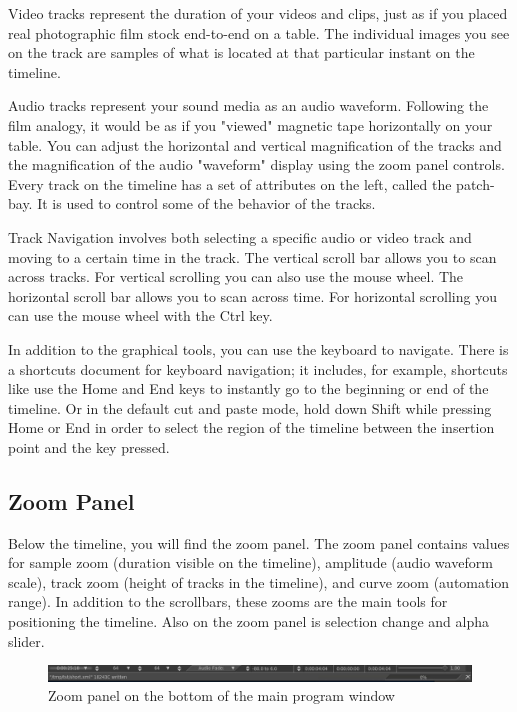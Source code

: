 Video tracks represent the duration of your videos and clips, just as if you placed real photographic film stock end-to-end on a table. 
The individual images you see on the track are samples of what is located at that particular instant on the timeline.

Audio tracks represent your sound media as an audio waveform. 
Following the film analogy, it would be as if you "viewed" magnetic tape horizontally on your table. 
You can adjust the horizontal and vertical magnification of the tracks and the magnification of the audio "waveform" display using the zoom panel controls. 
Every track on the timeline has a set of attributes on the left, called the patch-bay. 
It is used to control some of the behavior of the tracks.

Track Navigation involves both selecting a specific audio or video track and moving to a certain time in the track. 
The vertical scroll bar allows you to scan across tracks. 
For vertical scrolling you can also use the mouse wheel. 
The horizontal scroll bar allows you to scan across time. For horizontal scrolling you can use the mouse wheel with the Ctrl key.  

In addition to the graphical tools, you can use the keyboard to navigate.  
There is a shortcuts document for keyboard navigation; it includes, for example, shortcuts like use the Home and End keys to instantly go to the beginning or end of the timeline.  
Or in the default cut and paste mode, hold down Shift while pressing Home or End in order to select the region of the timeline between the insertion point and the key pressed.

\subsection{Zoom Panel}%
\label{sub:zoom_panel}

Below the timeline, you will find the zoom panel. 
The zoom panel contains values for sample zoom (duration visible on the timeline), amplitude (audio waveform scale), track zoom (height of tracks in the timeline), and curve zoom (automation range). 
In addition to the scrollbars, these zooms are the main tools for positioning the timeline.  
Also on the zoom panel is selection change and alpha slider.

\begin{figure}[htpb]
    \centering
    \includegraphics[width=0.99\linewidth]{images/zoompanel.png}
    \caption{Zoom panel on the bottom of the main program window}
    \label{fig:zoompanel}
\end{figure}

